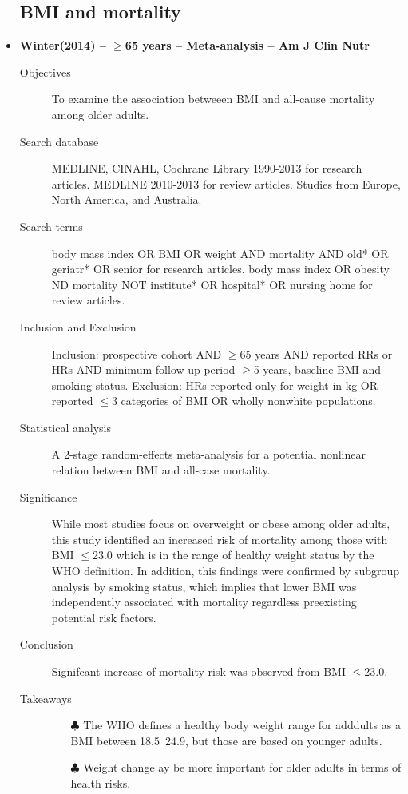 \documentclass{article}
\begin{document}
\begin{itemize}
\subsection{BMI and mortality}
	\item{\bf Winter(2014) -- $\geq$65 years -- Meta-analysis -- Am J Clin Nutr} 
		\begin{description}
			\item[Objectives]
				To examine the association betweeen BMI and all-cause mortality among older adults.
			\item[Search database] 
				MEDLINE, CINAHL, Cochrane Library 1990-2013 for research articles. MEDLINE 2010-2013 for review articles. Studies from Europe, North America, and Australia.
			\item[Search terms]
				body mass index OR BMI OR weight AND mortality AND old* OR geriatr* OR senior for research articles. body mass index OR obesity ND mortality NOT institute* OR hospital* OR nursing home for review articles.
			\item[Inclusion and Exclusion] 
				Inclusion: prospective cohort AND $\geq$65 years AND reported RRs or HRs AND minimum follow-up period $\geq$5 years, baseline BMI and smoking status. Exclusion: HRs reported only for weight in kg OR reported $\le$3 categories of BMI OR wholly nonwhite populations.
			\item[Statistical analysis] 
				A 2-stage random-effects meta-analysis for a potential nonlinear relation between BMI and all-case mortality.
			\item[Significance] 
				While most studies focus on overweight or obese among older adults, this study identified an increased risk of mortality among those with BMI $\le$23.0 which is in the range of healthy weight status by the WHO definition. In addition, this findings were confirmed by subgroup analysis by smoking status, which implies that lower BMI was independently associated with mortality regardless preexisting potential risk factors.
			\item[Conclusion] 
				Signifcant increase of mortality risk was observed from BMI $\le$23.0. 
			\item[Takeaways] \mbox{}\par
				\begin{itemize}
					\item[$\clubsuit$] The WHO defines a healthy body weight range for adddults as a BMI between 18.5~24.9, but those are based on younger adults.
					\item[$\clubsuit$] Weight change ay be more important for older adults in terms of health risks.
				\end{itemize}
		\end{description}


\end{itemize}
\end{document}
